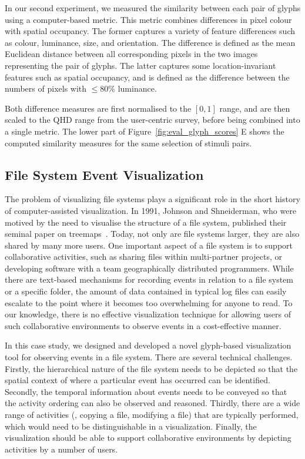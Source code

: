 In our second experiment, we measured the similarity between each pair of glyphs using a computer-based metric.
This metric combines differences in pixel colour with spatial occupancy.
The former captures a variety of feature differences such as colour, luminance, size, and orientation.
The difference is defined as the mean Euclidean distance between all corresponding pixels in the two images representing the pair of glyphs.
The latter captures some location-invariant features such as spatial occupancy, and is defined as the difference between the numbers of pixels with $\leq 80\%$ luminance.

Both difference measures are first normalised to the $[0, 1]$ range, and are then scaled to the QHD range from the user-centric survey, before being combined into a single metric.
The lower part of Figure~\ref{fig:eval_glyph_scores} E shows the computed similarity measures for the same selection of stimuli pairs.

\subsection{File System Event Visualization}
\label{sec:casestudy}

The problem of visualizing file systems plays a significant role in the short history of computer-assisted visualization.
In 1991, Johnson and Shneiderman, who were motived by the need to visualise the structure of a file system, published their seminal paper on treemaps~\cite{johnson91}.
Today, not only are file systems larger, they are also shared by many more users.
One important aspect of a file system is to support collaborative activities, such as sharing files within multi-partner projects, or developing software with a team geographically distributed programmers.
While there are text-based mechanisms for recording events in relation to a file system or a specific folder, the amount of data contained in typical log files can easily escalate to the point where it becomes too overwhelming for anyone to read.
To our knowledge, there is no effective visualization technique for allowing users of such collaborative environments to observe events in a cost-effective manner.

In this case study, we designed and developed a novel glyph-based visualization tool for observing events in a file system.
There are several technical challenges.
Firstly, the hierarchical nature of the file system needs to be depicted so that the spatial context of where a particular event has occurred can be identified.
Secondly, the temporal information about events needs to be conveyed so that the activity ordering can also be observed and reasoned.
Thirdly, there are a wide range of activities (\eg, copying a file, modifying a file) that are typically performed, which would need to be distinguishable in a visualization.
Finally, the visualization should be able to support collaborative environments by depicting activities by a number of users.

